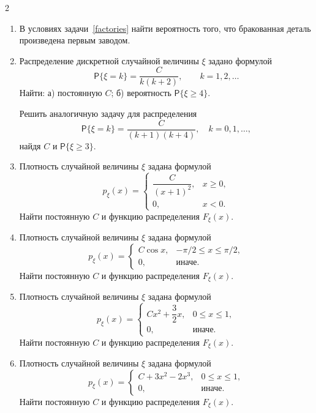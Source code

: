 \documentclass[a4paper,10pt]{article}
\newcommand{\PP}{\mathsf P}
\newcommand{\normalise}{Найти постоянную $C$ и функцию распределения $F_\xi(x)$.}
\begin{document}
\begin{multicols}{2}
\begin{enumerate}
\item\begin{minipage}[t]{\linewidth} В условиях задачи~\ref{factories} найти вероятность того, что бракованная деталь произведена первым заводом.

\end{minipage}

\item\begin{minipage}[t]{\linewidth} Распределение дискретной случайной величины $\xi$ задано формулой
\[
\PP\{\xi=k\}=\frac{C}{k(k+2)},\qquad k=1,2,\ldots
\]
Найти: а) постоянную $C$; б) вероятность $\PP\{\xi\geq4\}$.


Решить аналогичную задачу для распределения
\[
\PP\{\xi=k\}=\frac{C}{(k+1)(k+4)},\quad k=0,1,\ldots,
\]
найдя $C$ и $\PP\{\xi\geq3\}$.
\end{minipage}

\item\begin{minipage}[t]{\linewidth} Плотность случайной величины $\xi$ задана формулой
\[
p_\xi(x)=\begin{cases}\dfrac{C}{(x+1)^2},&x\geq0,\\[3pt]0,&x<0.\end{cases}
\]
\normalise
\end{minipage}

\item\begin{minipage}[t]{\linewidth} Плотность случайной величины $\xi$ задана формулой
\[
p_\xi(x)=\begin{cases}C\cos x,&-\pi/2\leq x\leq\pi/2,\\0,&\text{иначе}.\end{cases}
\]
\normalise
\end{minipage}

\item\begin{minipage}[t]{\linewidth} Плотность случайной величины $\xi$ задана формулой
\[
p_\xi(x)=\begin{cases}Cx^2+\dfrac32x,&0\leq x\leq1,\\[3pt]0,&\text{иначе}.\end{cases}
\]
\normalise
\end{minipage}

\item\begin{minipage}[t]{\linewidth} Плотность случайной величины $\xi$ задана формулой
\[
p_\xi(x)=\begin{cases}C+3x^2-2x^3,&0\leq x\leq1,\\0,&\text{иначе}.\end{cases}
\]
\normalise


\end{minipage}
\end{enumerate}
\end{multicols}
\end{document}
